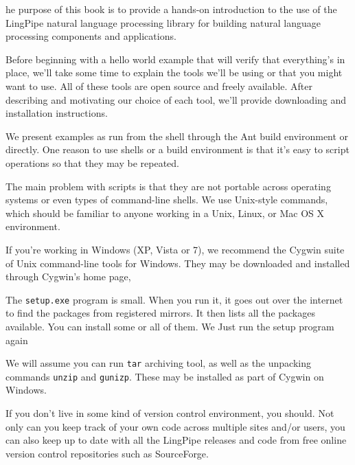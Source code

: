 
he purpose of this book is to provide a
hands-on introduction to the use of the LingPipe
natural language processing library for building natural
language processing components and applications.  

\noindent Before beginning with a hello world example that will verify
that everything's in place, we'll take some time to explain the tools
we'll be using or that you might want to use.  All of these tools are
open source and freely available.  After describing and motivating our
choice of each tool, we'll provide downloading and installation
instructions.


\noindent We present examples as run from the shell through the Ant
build environment or directly.  One reason to use shells or a build
environment is that it's easy to script operations so that they may be
repeated.

The main problem with scripts is that they are not portable across
operating systems or even types of command-line shells.
We use Unix-style commands, which should
be familiar to anyone working in a Unix, Linux, or Mac OS X environment.


\noindent
If you're working in Windows (XP, Vista or 7), we recommend the 
Cygwin suite of Unix command-line tools for Windows.  They may be
downloaded and installed through Cygwin's home page,

\begin{quote}
\end{quote}

The {\tt setup.exe} program is small.  When you run it, it goes out
over the internet to find the packages from registered mirrors.  It
then lists all the packages available.  You can install some or all of
them.  We  Just
run the setup program again 


\noindent
We will assume you can run {\tt tar} archiving tool, as well as the
unpacking commands {\tt unzip} and {\tt gunizp}.  These may be
installed as part of Cygwin on Windows.



\noindent
If you don't live in some kind of version control environment, you should.
Not only can you keep track of your own code across multiple sites and/or
users, you can also keep up to date with all the LingPipe releases and
code from free online version control repositories such as SourceForge.  

